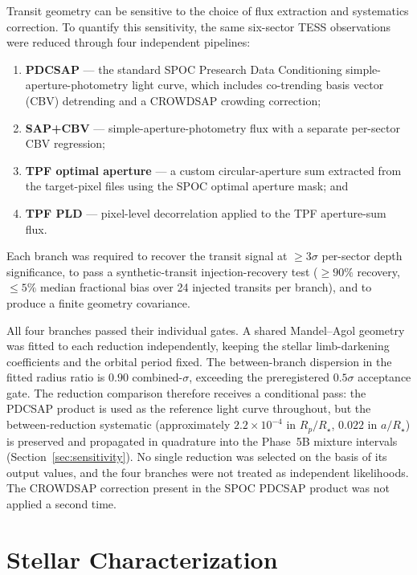 \documentclass[11pt]{article}
\begin{document}
Transit geometry can be sensitive to the choice of flux extraction and
systematics correction.  To quantify this sensitivity, the same six-sector
TESS observations were reduced through four independent pipelines:
\begin{enumerate}
  \item \textbf{PDCSAP} --- the standard SPOC Presearch Data Conditioning
    simple-aperture-photometry light curve, which includes co-trending basis
    vector (CBV) detrending and a CROWDSAP crowding correction;
  \item \textbf{SAP+CBV} --- simple-aperture-photometry flux with a separate
    per-sector CBV regression;
  \item \textbf{TPF optimal aperture} --- a custom circular-aperture sum
    extracted from the target-pixel files using the SPOC optimal aperture
    mask; and
  \item \textbf{TPF PLD} --- pixel-level decorrelation applied to the TPF
    aperture-sum flux.
\end{enumerate}
Each branch was required to recover the transit signal at $\geq 3\sigma$
per-sector depth significance, to pass a synthetic-transit injection-recovery
test ($\geq 90\%$ recovery, $\leq 5\%$ median fractional bias over 24
injected transits per branch), and to produce a finite geometry covariance.

All four branches passed their individual gates.  A shared Mandel--Agol
geometry was fitted to each reduction independently, keeping the stellar
limb-darkening coefficients and the orbital period fixed.  The between-branch
dispersion in the fitted radius ratio is $0.90$ combined-$\sigma$, exceeding
the preregistered $0.5\sigma$ acceptance gate.  The reduction comparison
therefore receives a conditional pass: the PDCSAP product is used as the
reference light curve throughout, but the between-reduction systematic
(approximately $2.2\times10^{-4}$ in $R_p/R_\star$, $0.022$ in $a/R_\star$) is
preserved and propagated in quadrature into the Phase~5B mixture intervals
(Section~\ref{sec:sensitivity}).
No single reduction was selected on the basis of its output values, and the
four branches were not treated as independent likelihoods.  The CROWDSAP
correction present in the SPOC PDCSAP product was not applied a second time.

\section{Stellar Characterization}
\label{sec:stellar}
\end{document}
